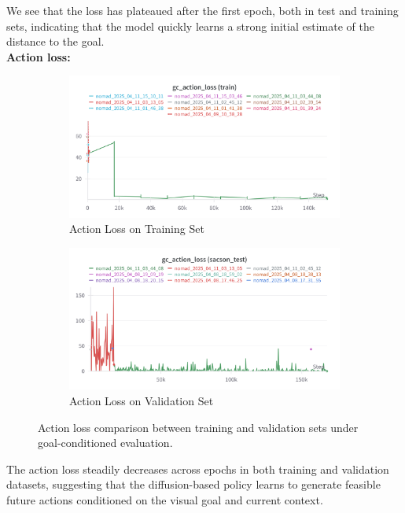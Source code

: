 \documentclass[12pt]{article}
\begin{document}
We see that the loss has plateaued after the first epoch, both in test and training sets, indicating that the model quickly learns a strong initial estimate of the distance to the goal.\\
\newpage
\noindent \textbf{Action loss:}\\
\begin{figure}[H]
    \centering
    \begin{subfigure}[b]{0.48\textwidth}
        \centering
        \includegraphics[width=\textwidth]{images/gc_actionloss_nomad.png}
        \caption{Action Loss on Training Set}
        \label{fig:gc_action_loss_train}
    \end{subfigure}
    \hfill
    \begin{subfigure}[b]{0.48\textwidth}
        \centering
        \includegraphics[width=\textwidth]{images/gc_actionloss_test_nomad.png}
        \caption{Action Loss on Validation Set}
        \label{fig:gc_action_loss_val}
    \end{subfigure}
    \caption{Action loss comparison between training and validation sets under goal-conditioned evaluation.}
\end{figure}
The action loss steadily decreases across epochs in both training and validation datasets, suggesting that the diffusion-based policy learns to generate feasible future actions conditioned on the visual goal and current context.\\
\end{document}
